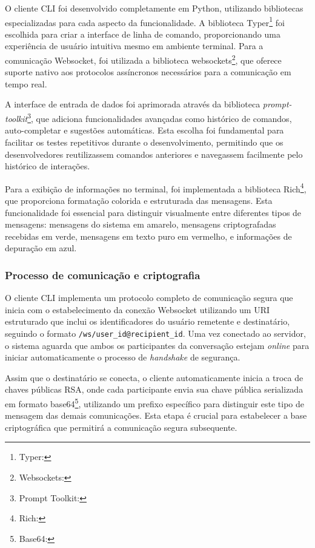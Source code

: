 O cliente \acs{CLI} foi desenvolvido completamente em Python, utilizando
bibliotecas especializadas para cada aspecto da funcionalidade. A
biblioteca Typer\footnote{Typer: } foi
escolhida para criar a interface de linha de
comando, proporcionando uma experiência de usuário intuitiva mesmo em
ambiente terminal. Para a comunicação Websocket, foi utilizada a
biblioteca
websockets\footnote{Websockets:
},
que oferece suporte nativo aos protocolos
assíncronos necessários para a comunicação em tempo real.

A interface de entrada de dados foi aprimorada através da biblioteca
\textit{prompt-toolkit}\footnote{Prompt Toolkit:
},
que adiciona funcionalidades avançadas como histórico
de comandos, auto-completar e sugestões automáticas. Esta escolha foi
fundamental para facilitar os testes repetitivos durante o
desenvolvimento, permitindo que os desenvolvedores reutilizassem
comandos anteriores e navegassem facilmente pelo histórico de interações.

Para a exibição de informações no terminal, foi implementada a
biblioteca
Rich\footnote{Rich: }, que
proporciona formatação colorida e estruturada
das mensagens. Esta funcionalidade foi essencial para distinguir
visualmente entre diferentes tipos de mensagens: mensagens do sistema
em amarelo, mensagens criptografadas recebidas em verde, mensagens em
texto puro em vermelho, e informações de depuração em azul.

\subsubsection{Processo de comunicação e criptografia}

O cliente \acs{CLI} implementa um protocolo completo de comunicação segura
que inicia com o estabelecimento da conexão Websocket utilizando um
\acs{URI} estruturado que inclui os identificadores do usuário remetente e
destinatário, seguindo o formato \texttt{/ws/{user\_id}@{recipient\_id}}. Uma
vez conectado ao servidor, o sistema aguarda que ambos os
participantes da conversação estejam \textit{online} para iniciar
automaticamente o processo de \textit{handshake} de segurança.

Assim que o destinatário se conecta, o cliente automaticamente inicia
a troca de chaves públicas \acs{RSA}, onde cada participante envia sua
chave pública serializada em formato
base64\footnote{Base64: },
utilizando um prefixo
específico para distinguir este tipo de mensagem das demais
comunicações. Esta etapa é crucial para estabelecer a base
criptográfica que permitirá a comunicação segura subsequente.

